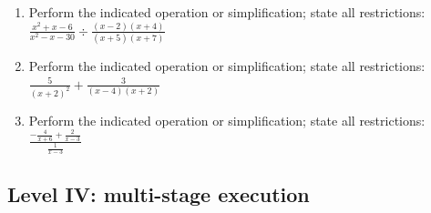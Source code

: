 \documentclass[11pt,oneside]{book}
\begin{document}
\begin{enumerate}[leftmargin=*,label=\textbf{\arabic*.},itemsep=0.65\baselineskip]
\item Perform the indicated operation or simplification; state all restrictions: $\displaystyle \frac{x^{2} + x - 6}{x^{2} - x - 30}\div\frac{\left(x - 2\right) \left(x + 4\right)}{\left(x + 5\right) \left(x + 7\right)}$
\item Perform the indicated operation or simplification; state all restrictions: $\displaystyle \frac{5}{\left(x + 2\right)^{2}}+\frac{3}{\left(x - 4\right) \left(x + 2\right)}$
\item Perform the indicated operation or simplification; state all restrictions: $\displaystyle \frac{- \frac{4}{x + 6} + \frac{2}{x - 3}}{\frac{1}{x - 3}}$
\end{enumerate}
\subsection*{Level IV: multi-stage execution}
\end{document}
